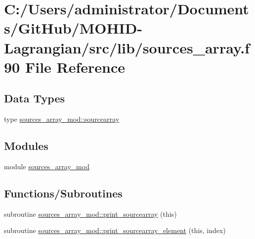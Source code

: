 \hypertarget{sources__array_8f90}{}\section{C\+:/\+Users/administrator/\+Documents/\+Git\+Hub/\+M\+O\+H\+I\+D-\/\+Lagrangian/src/lib/sources\+\_\+array.f90 File Reference}
\label{sources__array_8f90}
\subsection*{Data Types}
\begin{DoxyCompactItemize}
\item 
type \mbox{\hyperlink{structsources__array__mod_1_1sourcearray}{sources\+\_\+array\+\_\+mod\+::sourcearray}}
\end{DoxyCompactItemize}
\subsection*{Modules}
\begin{DoxyCompactItemize}
\item 
module \mbox{\hyperlink{namespacesources__array__mod}{sources\+\_\+array\+\_\+mod}}
\end{DoxyCompactItemize}
\subsection*{Functions/\+Subroutines}
\begin{DoxyCompactItemize}
\item 
subroutine \mbox{\hyperlink{namespacesources__array__mod_aa2e56a704fb4483fff2b2bd65c8db8da}{sources\+\_\+array\+\_\+mod\+::print\+\_\+sourcearray}} (this)
\item 
subroutine \mbox{\hyperlink{namespacesources__array__mod_a83b399b5839262af19adcae73824874e}{sources\+\_\+array\+\_\+mod\+::print\+\_\+sourcearray\+\_\+element}} (this, index)
\end{DoxyCompactItemize}
